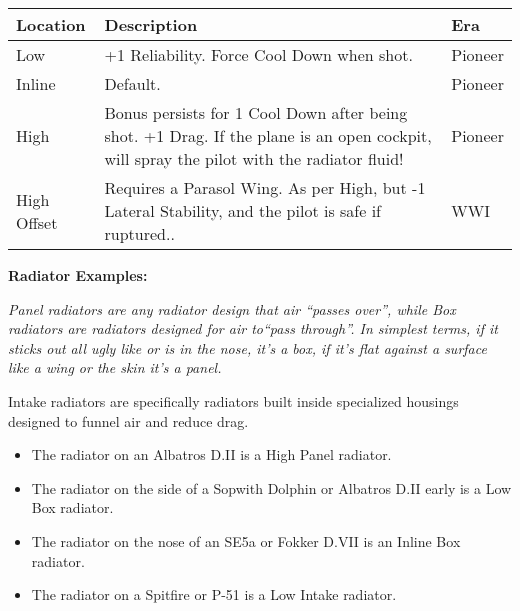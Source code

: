 \documentclass{article}
\begin{document}
\begin{tabular}{|l|l|l|}
    \hline
    Location                                       & Description                                                      & Era     \\\hline
    Low                                            & +1 Reliability. Force Cool Down when shot.                       & Pioneer \\\hline
    Inline                                         & Default.                                                         & Pioneer \\\hline
    High                                           & Bonus persists for 1 Cool Down after being shot. +1 Drag. If the
    plane is an open cockpit, will spray the pilot with the radiator fluid!
                                                   & Pioneer                                                                    \\\hline
    High Offset                                    & Requires a Parasol Wing. As per High, but -1 Lateral
    Stability, and the pilot is safe if ruptured.. & WWI                                                                        \\\hline
\end{tabular}

\textbf{Radiator Examples: }

\emph{Panel radiators are any radiator design that air
    ``passes over'', while Box radiators are
    radiators designed for air to``pass
    through''. In simplest terms, if it sticks out all ugly
    like or is in the nose, it's a box, if
    it's flat against a surface like a wing
    or the skin it's a panel.}

Intake radiators are specifically radiators built inside
specialized housings designed to funnel air and reduce drag.

\begin{itemize}
    \item          The radiator on an Albatros D.II is a High Panel radiator.
    \item          The radiator on the side of a Sopwith Dolphin or Albatros D.II
          early is a Low Box radiator.
    \item          The radiator on the nose of an SE5a or Fokker D.VII is an
          Inline Box radiator.
    \item          The radiator on a Spitfire or P-51 is a Low Intake radiator.
\end{itemize}
\end{document}
